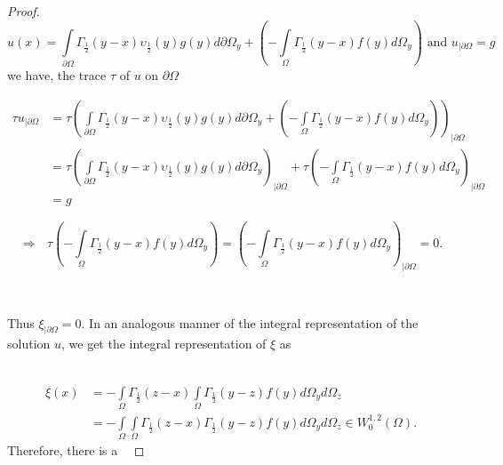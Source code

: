 \documentclass{amsart}%
\theoremstyle{plain}
\numberwithin{equation}{section}
\begin{document}
\begin{proof}
\[
u\left(  x\right)  =%
{\displaystyle\int\limits_{\partial\Omega}}
\Gamma_{\frac{1}{2}}\left(  y-x\right)  \upsilon_{\frac{1}{2}}\left(
y\right)  g(y)d\partial\Omega_{y}+\left(  -%
{\displaystyle\int\limits_{\Omega}}
\Gamma_{\frac{1}{2}}\left(  y-x\right)  f(y)d\Omega_{y}\right)  \text{ \ and
\ }u_{\mid\partial\Omega}=g
\]
we have, the trace $\tau$ of $u$ on $\partial\Omega$%

\begin{align*}
\tau u_{\mid\partial\Omega}  & =\tau\left(
{\displaystyle\int\limits_{\partial\Omega}}
\Gamma_{\frac{1}{2}}\left(  y-x\right)  \upsilon_{\frac{1}{2}}\left(
y\right)  g(y)d\partial\Omega_{y}+\left(  -%
{\displaystyle\int\limits_{\Omega}}
\Gamma_{\frac{1}{2}}\left(  y-x\right)  f(y)d\Omega_{y}\right)  \right)
_{\mid\partial\Omega}\\
& =\tau\left(
{\displaystyle\int\limits_{\partial\Omega}}
\Gamma_{\frac{1}{2}}\left(  y-x\right)  \upsilon_{\frac{1}{2}}\left(
y\right)  g(y)d\partial\Omega_{y}\right)  _{\mid\partial\Omega}+\tau\left(  -%
{\displaystyle\int\limits_{\Omega}}
\Gamma_{\frac{1}{2}}\left(  y-x\right)  f(y)d\Omega_{y}\right)  _{\mid
\partial\Omega}\\
& =g
\end{align*}
%

\[
\Longrightarrow\text{ \ \ \ \ }\tau\left(  -%
{\displaystyle\int\limits_{\Omega}}
\Gamma_{\frac{1}{2}}\left(  y-x\right)  f(y)d\Omega_{y}\right)  =\left(  -%
{\displaystyle\int\limits_{\Omega}}
\Gamma_{\frac{1}{2}}\left(  y-x\right)  f(y)d\Omega_{y}\right)  _{\mid
\partial\Omega}=0\text{.}%
\]


\ \ 

Thus $\xi_{\mid\partial\Omega}=0$. In an analogous manner of the integral
representation of the solution $u$, we get the integral representation of
$\xi$ as

\
\begin{align*}
\xi\left(  x\right)   & =-%
{\displaystyle\int\limits_{\Omega}}
\Gamma_{\frac{1}{2}}\left(  z-x\right)
{\displaystyle\int\limits_{\Omega}}
\Gamma_{\frac{1}{2}}\left(  y-z\right)  f(y)d\Omega_{y}d\Omega_{z}\\
& =-%
{\displaystyle\int\limits_{\Omega}}
{\displaystyle\int\limits_{\Omega}}
\Gamma_{\frac{1}{2}}\left(  z-x\right)  \Gamma_{\frac{1}{2}}\left(
y-z\right)  f(y)d\Omega_{y}d\Omega_{z}\in W_{0}^{1,2}\left(  \Omega\right)
\text{.}%
\end{align*}
Therefore, there is a \ %


\end{proof}
\end{document}
